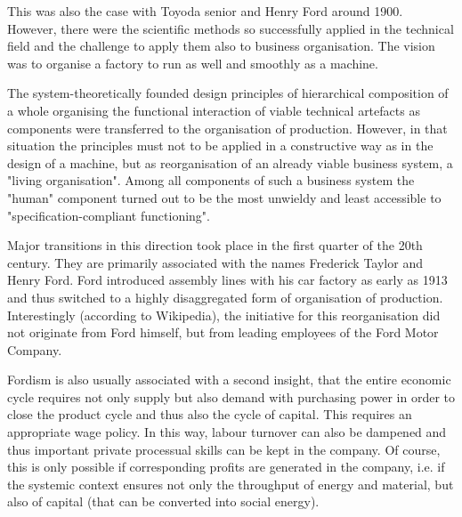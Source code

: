 \documentclass[11pt,a4paper]{article}
\begin{document}
This was also the case with Toyoda senior and Henry Ford around 1900. However,
there were the scientific methods so successfully applied in the technical
field and the challenge to apply them also to business organisation. The
vision was to organise a factory to run as well and smoothly as a machine.

The system-theoretically founded design principles of hierarchical composition
of a whole organising the functional interaction of viable technical artefacts
as components were transferred to the organisation of production. However, in
that situation the principles must not to be applied in a constructive way as
in the design of a machine, but as reorganisation of an already viable
business system, a "living organisation". Among all components of such a
business system the "human" component turned out to be the most unwieldy and
least accessible to "specification-compliant functioning".

Major transitions in this direction took place in the first quarter of the
20th century. They are primarily associated with the names Frederick Taylor
and Henry Ford. Ford introduced assembly lines with his car factory as early
as 1913 and thus switched to a highly disaggregated form of organisation of
production. Interestingly (according to Wikipedia), the initiative for this
reorganisation did not originate from Ford himself, but from leading employees
of the Ford Motor Company.

Fordism is also usually associated with a second insight, that the entire
economic cycle requires not only supply but also demand with purchasing power
in order to close the product cycle and thus also the cycle of capital. This
requires an appropriate wage policy. In this way, labour turnover can also be
dampened and thus important private processual skills can be kept in the
company. Of course, this is only possible if corresponding profits are
generated in the company, i.e. if the systemic context ensures not only the
throughput of energy and material, but also of capital (that can be converted
into social energy).
\end{document}
